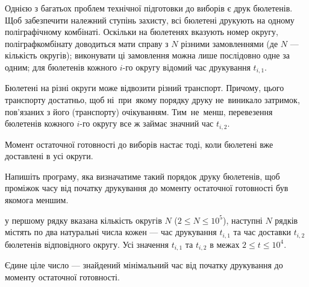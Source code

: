 ﻿Однією з багатьох проблем технічної підготовки до виборів є друк бюлетенів. Щоб
забезпечити належний ступінь захисту, всі бюлетені друкують на одному поліграфічному
комбінаті. Оскільки на бюлетенях вказують номер округу, поліграфкомбінату доводиться
мати справу з $N$ різними замовленнями (де $N$ --- кількість округів); виконувати ці замовлення
можна лише послідовно одне за одним; для бюлетенів кожного $i$-го округу відомий час
друкування $t_{i,1}$.

Бюлетені на різні округи може відвозити різний транспорт. Причому, цього транспорту
достатньо, щоб ні~при~якому порядку друку не~виникало затримок, пов’язаних з його
(транспорту) очікуванням. Тим~не~менш, перевезення бюлетенів кожного $i$-го округу все ж
займає значний час $t_{i,2}$.

Момент остаточної готовності до виборів настає тоді, коли бюлетені вже доставлені в усі
округи.

Напишіть програму, яка визначатиме такий порядок друку бюлетенів, щоб проміжок часу від
початку друкування до моменту остаточної готовності був якомога меншим.

\InputFile
у першому рядку вказана кількість округів $N$ ($2\leqslant N \leqslant 10^5$), наступні $N$ рядків
містять по два натуральні числа кожен --- час друкування $t_{i,1}$ та час доставки $t_{i,2}$ бюлетенів
відповідного округу. Усі значення $t_{i,1}$ та $t_{i,2}$ в межах $2\leqslant t\leqslant 10^4$.

\OutputFile
Єдине ціле число --- знайдений мінімальний час від початку друкування до моменту остаточної готовності.

\Examples
\begin{example}
\end{example}
